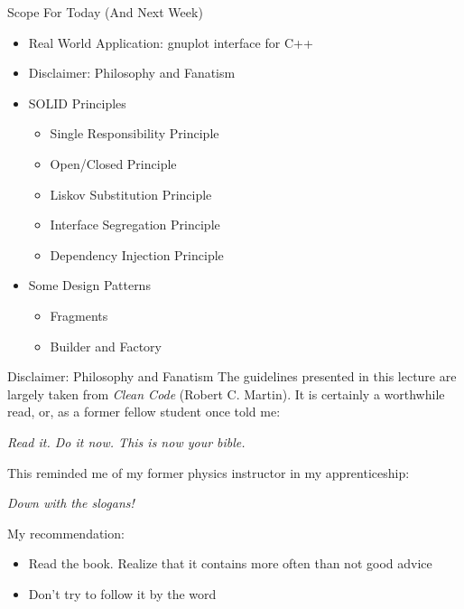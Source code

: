 \begin{frame}{Scope For Today (And Next Week)}
%
\begin{itemize}
\item Real World Application: gnuplot interface for C++
\item Disclaimer: Philosophy and Fanatism
\item SOLID Principles
	\begin{itemize}
	\item Single Responsibility Principle
	\item Open/Closed Principle
	\color{gray}
	\item Liskov Substitution Principle
	\item Interface Segregation Principle
	\item Dependency Injection Principle
	\end{itemize}
\item Some Design Patterns
	\begin{itemize}
	\item Fragments
	\item Builder and Factory
	\end{itemize}
\end{itemize}
%
\end{frame}


\begin{frame}{Disclaimer: Philosophy and Fanatism}
%
\small
The guidelines presented in this lecture are largely taken from \emph{Clean Code} (Robert C. Martin).
It is certainly a worthwhile read, or, as a former fellow student once told me:

\begin{defbox}
\emph{Read it. Do it now. This is now your bible.}
\end{defbox}
\pause

This reminded me of my former physics instructor in my apprenticeship:
\begin{defbox}
\emph{Down with the slogans!}
\end{defbox}
\pause

My recommendation:
\begin{itemize}
\item Read the book. Realize that it contains more often than not good advice
\item Don't try to follow it by the word
\end{itemize}
%
\end{frame}

